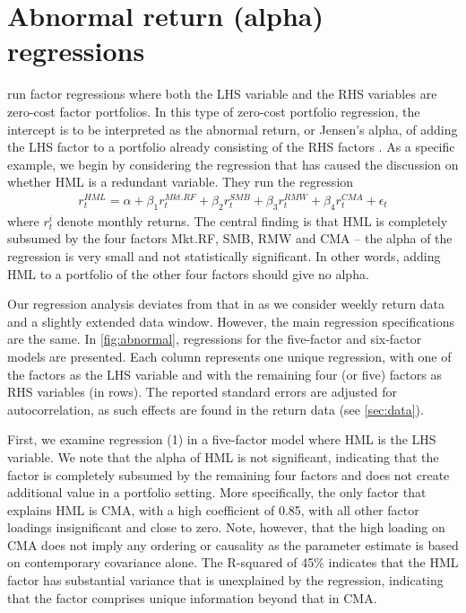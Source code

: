 
\section{Abnormal return (alpha) regressions}
\label{sec:alpha_reg}
\textcite{FF2015} run factor regressions where both the LHS variable and the RHS variables are zero-cost factor portfolios. In this type of zero-cost portfolio regression, the intercept is to be interpreted as the abnormal return, or Jensen's alpha, of adding the LHS factor to a portfolio already consisting of the RHS factors \autocite{Jensen1968}. As a specific example, we begin by considering the regression that has caused the discussion on whether HML is a redundant variable. They run the regression
\begin{align}
  r^{HML}_t = \alpha + \beta_1 r^{Mkt.RF}_t + \beta_2 r^{SMB}_t + \beta_3 r^{RMW}_t + \beta_4 r^{CMA}_t + \epsilon_t
\end{align}
where $r^i_t$ denote monthly returns. The central finding is that HML is completely subsumed by the four factors Mkt.RF, SMB, RMW and CMA -- the alpha of the regression is very small and not statistically significant. In other words, adding HML to a portfolio of the other four factors should give no alpha.

Our regression analysis deviates from that in \textcite{FF2015} as we consider weekly return data and a slightly extended data window. However, the main regression specifications are the same. In \autoref{fig:abnormal}, regressions for the five-factor and six-factor models are presented. Each column represents one unique regression, with one of the factors as the LHS variable and with the remaining four (or five) factors as RHS variables (in rows). The reported standard errors are adjusted for autocorrelation, as such effects are found in the return data (see \autoref{sec:data}).

First, we examine regression (1) in a five-factor model where HML is the LHS variable. We note that the alpha of HML is not significant, indicating that the factor is completely subsumed by the remaining four factors and does not create additional value in a portfolio setting. More specifically, the only factor that explains HML is CMA, with a high coefficient of 0.85, with all other factor loadings insignificant and close to zero. Note, however, that the high loading on CMA does not imply any ordering or causality as the parameter estimate is based on contemporary covariance alone. The R-squared of 45\% indicates that the HML factor has substantial variance that is unexplained by the regression, indicating that the factor comprises unique information beyond that in CMA.


